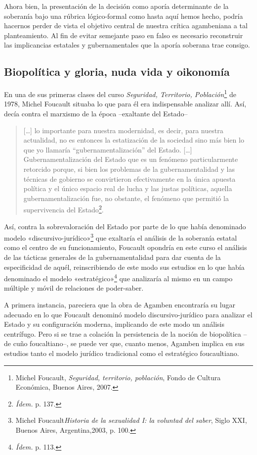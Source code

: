 Ahora bien, la presentación de la decisión como aporía determinante de la soberanía bajo una rúbrica lógico-formal como hasta aquí hemos hecho, podría hacernos perder de vista el objetivo central de nuestra crítica agambeniana a tal planteamiento. Al fin de evitar semejante paso en falso es necesario reconstruir las implicancias estatales y gubernamentales que la aporía soberana trae consigo.

\subsection{Biopolítica y gloria, nuda vida y oikonomía}

En una de sus primeras clases del curso \emph{Seguridad, Territorio, Población}\footnote{Michel Foucault, \emph{Seguridad, territorio, población}, Fondo de Cultura Económica, Buenos Aires, 2007.} de 1978, Michel Foucault situaba lo que para él era indispensable analizar allí. Así, decía contra el marxismo de la época --exaltante del Estado--

\begin{quote}
{[}\ldots{]} lo importante para nuestra modernidad, es decir, para nuestra actualidad, no es entonces la estatización de la sociedad sino más bien lo que yo llamaría ``gubernamentalización'' del Estado. {[}\ldots{]} Gubernamentalización del Estado que es un fenómeno particularmente retorcido porque, si bien los problemas de la gubernamentalidad y las técnicas de gobierno se convirtieron efectivamente en la única apuesta política y el único espacio real de lucha y las justas políticas, aquella gubernamentalización fue, no obstante, el fenómeno que permitió la supervivencia del Estado\footnote{\emph{Ídem.} p. 137.}.
\end{quote}

Así, contra la sobrevaloración del Estado por parte de lo que había denominado modelo «discursivo-jurídico»\footnote{Michel Foucault\emph{Historia de la sexualidad I: la voluntad del saber}, Siglo XXI, Buenos Aires, Argentina,2003, p. 100.} que exaltaría el análisis de la soberanía estatal como el centro de su funcionamiento, Foucault opondría en este curso el análisis de las tácticas generales de la gubernamentalidad para dar cuenta de la especificidad de aquél, reinscribiendo de este modo sus estudios en lo que había denominado el modelo «estratégico»\footnote{\emph{Ídem.} p. 113.} que analizaría al mismo en un campo múltiple y móvil de relaciones de poder-saber.

A primera instancia, pareciera que la obra de Agamben encontraría su lugar adecuado en lo que Foucault denominó modelo discursivo-jurídico para analizar el Estado y su configuración moderna, implicando de este modo un análisis centrífugo. Pero si se trae a colación la persistencia de la noción de biopolítica --de cuño foucaltiano--, se puede ver que, cuanto menos, Agamben implica en sus estudios tanto el modelo jurídico tradicional como el estratégico foucaultiano.

